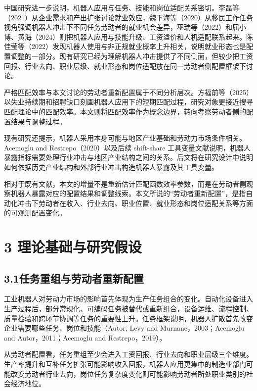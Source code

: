中国研究进一步说明，机器人应用与任务、技能和岗位适配关系密切。李磊等（2021）从企业需求和产出扩张讨论就业效应，魏下海等（2020）从移民工作任务视角强调机器人冲击下不同任务劳动者的就业机会差异，巫瑞等（2022）和屈小博、黄海（2024）则把机器人应用与技能升级、工资溢价和人机适配联系起来。陈佳莹等（2022）发现机器人使用与非正规就业概率上升相关，说明就业形态也是配置调整的一部分。现有研究已经为理解机器人冲击提供了不同侧面，但较少把工资回报、行业去向、职业层级、就业形态和岗位适配放在同一劳动者侧配置框架下讨论。

严格匹配效率与本文讨论的劳动者重新配置属于不同分析层次。方福前等（2025）以失业持续期和招聘缺口刻画机器人应用下的短期匹配过程，研究对象更接近搜寻匹配理论中的匹配效率。本文则将匹配效率作为概念边界，转向考察劳动者侧的配置结果与调整过程。

现有研究还提示，机器人采用本身可能与地区产业基础和劳动力市场条件相关。Acemoglu and Restrepo（2020）以及后续 shift-share 工具变量文献说明，机器人暴露指标需要处理行业冲击与地区产业结构之间的关系。后文将在研究设计中说明如何依据历史产业结构和外部行业冲击构造机器人暴露及其工具变量。

相对于既有文献，本文的增量不是重新估计匹配函数效率参数，而是在劳动者侧观察机器人暴露对应的配置结果和调整线索。本文所说的``劳动者重新配置''，是指自动化冲击下劳动者在收入、行业去向、职业位置、就业形态和岗位适配关系等方面的可观测配置变化。

\section{3 理论基础与研究假设}\label{ux7406ux8bbaux57faux7840ux4e0eux7814ux7a76ux5047ux8bbe}

\subsection{3.1任务重组与劳动者重新配置}\label{ux4efbux52a1ux91cdux7ec4ux4e0eux52b3ux52a8ux8005ux91cdux65b0ux914dux7f6e}

工业机器人对劳动力市场的影响首先体现为生产任务组合的变化。自动化设备进入生产过程后，部分常规化、可编码任务被替代或重新组合，设备运维、流程控制、质量检验和跨环节协调等任务的重要性上升。任务框架说明，机器人扩散首先改变企业需要哪些任务、岗位和技能（Autor, Levy and Murnane，2003；Acemoglu and Autor，2011；Acemoglu and Restrepo，2019）。

从劳动者配置看，任务重组至少会进入工资回报、行业去向和职业层级三个维度。生产率提升和互补任务扩张可能影响收入回报，机器人应用更集中的制造业部门可能改变劳动者行业去向，岗位任务复杂度变化则可能影响劳动者所处职业类别的社会经济地位。

